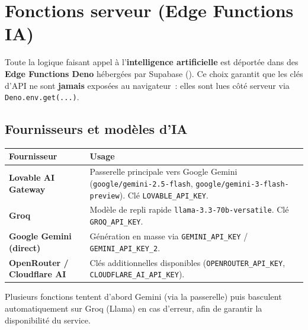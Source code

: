 \chapter{Fonctions serveur (Edge Functions IA)}

Toute la logique faisant appel à l'\textbf{intelligence artificielle} est
déportée dans des \textbf{Edge Functions Deno} hébergées par Supabase
(). Ce choix garantit que les clés d'API ne sont
\textbf{jamais} exposées au navigateur~: elles sont lues côté serveur via
\texttt{Deno.env.get(...)}.

\section{Fournisseurs et modèles d'IA}
\begin{longtable}{p{5cm}p{9.5cm}}
\toprule \textbf{Fournisseur} & \textbf{Usage} \\ \midrule \endhead
\textbf{Lovable AI Gateway} & Passerelle principale vers Google Gemini
(\texttt{google/gemini-2.5-flash}, \texttt{google/gemini-3-flash-preview}).
Clé \texttt{LOVABLE\_API\_KEY}. \\
\textbf{Groq} & Modèle de repli rapide \texttt{llama-3.3-70b-versatile}.
Clé \texttt{GROQ\_API\_KEY}. \\
\textbf{Google Gemini (direct)} & Génération en masse via \texttt{GEMINI\_API\_KEY} /
\texttt{GEMINI\_API\_KEY\_2}. \\
\textbf{OpenRouter / Cloudflare AI} & Clés additionnelles disponibles
(\texttt{OPENROUTER\_API\_KEY}, \texttt{CLOUDFLARE\_AI\_API\_KEY}). \\
\bottomrule
\end{longtable}

\begin{notebox}
Plusieurs fonctions tentent d'abord Gemini (via la passerelle) puis basculent
automatiquement sur Groq (Llama) en cas d'erreur, afin de garantir la
disponibilité du service.
\end{notebox}

